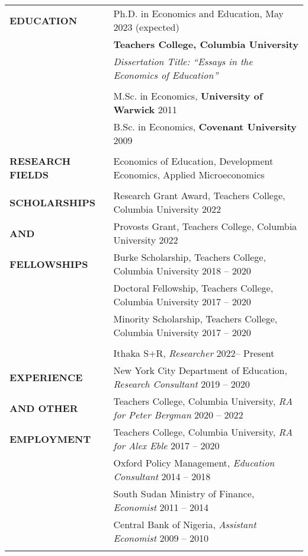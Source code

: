 \documentclass[letterpaper, 11pt]{article}
\begin{document}
\begin{longtable}{p{1.2in}p{4.8in}}


{\textbf{EDUCATION}} 
& Ph.D. in Economics and Education, \hfill May 2023 (expected)  \\
&  \textbf{Teachers College, Columbia University} \\ 
&  {\it Dissertation Title: ``Essays in the Economics of Education''}\\
& \\

& M.Sc. in Economics, \textbf{University of Warwick} \hfill 2011 \\

& B.Sc. in Economics, \textbf{Covenant University} \hfill 2009 \\

& \\


\nohyphens{{\textbf{RESEARCH FIELDS}}}
& Economics of Education, Development Economics, Applied Microeconomics  \\
\\


{{\textbf{SCHOLARSHIPS}}} 
& Research Grant Award, Teachers College, Columbia University \hfill 2022\\
{{\textbf{AND}}} 
& Provosts Grant, Teachers College, Columbia University \hfill 2022 \\
{{\textbf{FELLOWSHIPS}}} 
& Burke Scholarship, Teachers College, Columbia University \hfill 2018 -- 2020 \\
& Doctoral Fellowship, Teachers College, Columbia University \hfill 2017 -- 2020 \\
& Minority Scholarship, Teachers College, Columbia University \hfill 2017 -- 2020 \\
& \\


\nohyphens{{\textbf{RESEARCH}} 
& Ithaka S+R, \textit{Researcher} \hfill 2022-- Present \\
\textbf{{EXPERIENCE}}} 
& New York City Department of Education, \textit{Research Consultant}   \hfill 2019 -- 2020 \\ 
\textbf{{AND OTHER}}
&   Teachers College, Columbia University, \textit{RA for Peter Bergman}  \hfill 2020 -- 2022 \\
\textbf{{EMPLOYMENT}}
& Teachers College, Columbia University, \textit{RA for Alex Eble} \hfill 2017 -- 2020 \\ 
& Oxford Policy Management, \textit{Education Consultant}  \hfill 2014 -- 2018 \\
& South Sudan Ministry of Finance, \textit{Economist}  \hfill 2011 -- 2014 \\
& Central Bank of Nigeria, \textit{Assistant Economist}  \hfill 2009 -- 2010 \\
& \\



\end{longtable}
\end{document}
